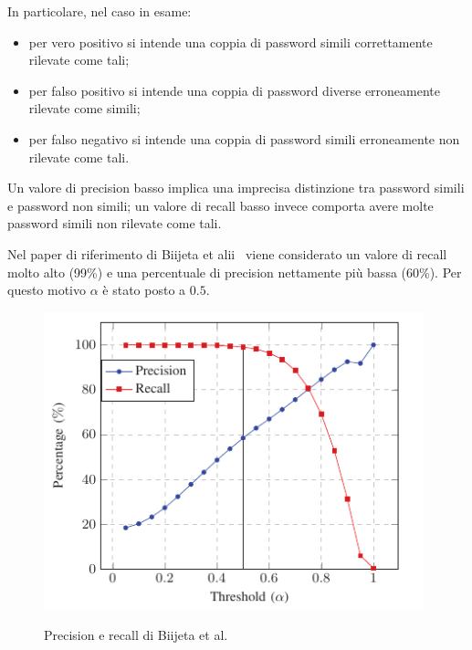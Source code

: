 In particolare, nel caso in esame:
\begin{itemize}
    \item per vero positivo si intende una coppia di password simili correttamente rilevate come tali;
    \item per falso positivo si intende una coppia di password diverse erroneamente rilevate come simili;
    \item per falso negativo si intende una coppia di password simili erroneamente non rilevate come tali.
\end{itemize}
Un valore di precision basso implica una imprecisa distinzione tra password simili e password non simili; un valore di recall basso invece comporta avere molte password simili non rilevate come tali.

Nel paper di riferimento di Biijeta et alii~\cite{biijeta} viene considerato un valore di recall molto alto (99\%) e una percentuale di precision nettamente più bassa (60\%). Per questo motivo $\alpha$ è stato posto a $0.5$.

\begin{figure}[h]
    \centering
    \includegraphics[width=11cm]{./immagini/precision_recall_paper_Biijeta.png}
    \label{precisionbiijeta}
    \caption{Precision e recall di Biijeta et al.~\cite{biijeta}}
\end{figure}
